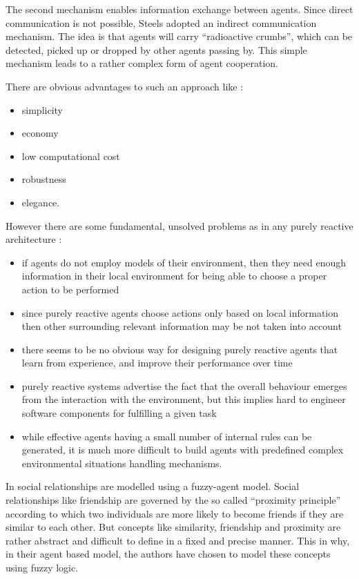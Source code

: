 The second mechanism enables information exchange between agents. Since direct communication is not possible, Steels adopted an indirect communication mechanism. The idea is that agents will carry ``radioactive crumbs'', which can be detected, picked up or dropped by other agents passing by. This simple mechanism leads to a rather complex form of agent cooperation.

There are obvious advantages to such an approach like \cite{Wooldridge09AnIntroduction}:
\begin{itemize}
\item  simplicity
\item economy 
\item  low computational cost
\item  robustness 
\item  elegance.
\end{itemize}

However there are some fundamental, unsolved problems as in any purely reactive architecture \cite{Wooldridge09AnIntroduction}:
\begin{itemize}
\item
	if agents do not employ models of their environment, then they need enough information in their local environment for being able to choose a proper action to be performed
\item
	since purely reactive agents choose actions only  based on local information then other surrounding relevant information may be not taken into account
\item
there seems to be no obvious way for designing purely reactive agents that learn from experience, and improve their performance over time
\item
purely reactive systems advertise the fact that the overall behaviour emerges from the interaction with the environment, but this implies hard to engineer software components for fulfilling a given task
\item
	while effective agents having a small number of internal rules can be generated, it is much more difficult to build agents with predefined complex environmental situations handling mechanisms. 
\end{itemize}

In \cite{Hassan08Friends} social relationships are modelled using a fuzzy-agent model. 
Social relationships like friendship are governed by the so called ``proximity principle''  according to which two individuals are more likely to become friends if they are similar to each other. But concepts like similarity, friendship and proximity are rather abstract and difficult to define in a fixed and precise manner. This in why, in their agent based model, the authors have chosen to model these concepts using fuzzy logic.

